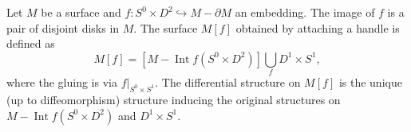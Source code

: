 Let $M$ be a surface and $f: S^0 \times D^2 \hookrightarrow M - \partial M$ an embedding. The image of $f$ is a pair of disjoint disks in $M$. The surface $M[f]$ obtained by attaching a handle is defined as
$$
M[f] = \left[M - \operatorname{Int} f(S^0 \times D^2)\right] \bigcup_{f} D^1 \times S^1,
$$
where the gluing is via $f|_{S^0 \times S^1}$. The differential structure on $M[f]$ is the unique (up to diffeomorphism) structure inducing the original structures on $M - \operatorname{Int} f(S^0 \times D^2)$ and $D^1 \times S^1$.
